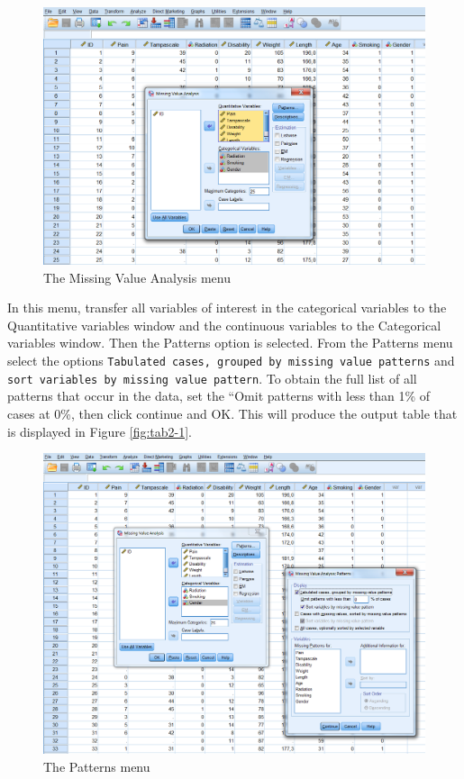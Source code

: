 \documentclass[]{book}
\begin{document}
\begin{figure}

{\centering \includegraphics[width=0.9\linewidth]{images/fig2.3} 

}

\caption{The Missing Value Analysis menu}\label{fig:fig2-3}
\end{figure}

In this menu, transfer all variables of interest in the categorical
variables to the Quantitative variables window and the continuous
variables to the Categorical variables window. Then the Patterns option
is selected. From the Patterns menu select the options
\texttt{Tabulated\ cases,\ grouped\ by\ missing\ value\ patterns} and
\texttt{sort\ variables\ by\ missing\ value\ pattern}. To obtain the
full list of all patterns that occur in the data, set the ``Omit
patterns with less than 1\% of cases at 0\%, then click continue and OK.
This will produce the output table that is displayed in Figure
\ref{fig:tab2-1}.

\begin{figure}

{\centering \includegraphics[width=0.9\linewidth]{images/fig2.4} 

}

\caption{The Patterns menu}\label{fig:fig2-4}
\end{figure}
\end{document}

